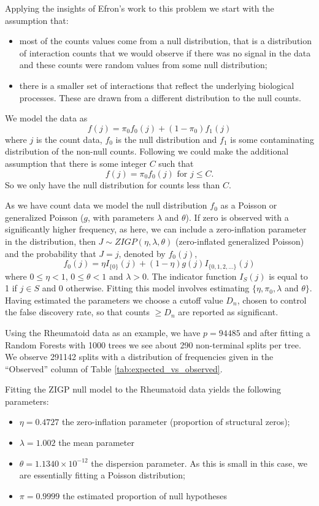 \documentclass[preprint,12pt,3p]{elsarticle}
\begin{document}
Applying the insights of Efron's work to this problem we start with the assumption that:
\begin{itemize}
\item most of the counts values come from a null distribution, that is a distribution of interaction
  counts that we would observe if there was no signal in the data and these counts were random values from some null distribution;
\item there is a smaller set of interactions that reflect the underlying biological processes. These are drawn from a
  different distribution to the null counts.
\end{itemize}

We model the data as 
\[
f (j ) = \pi_0 f_0 (j ) + (1 - \pi_0 )f_1 (j )
\]
where $j$ is the count data, $f_0$ is the null distribution and $f_1$ is some contaminating distribution of the
non-null counts. Following \cite{Gauran.et.al.2018} we could make the additional assumption that there is some integer $C$ such that
\begin{equation}
  f(j ) = \pi_0 f_0 (j ) \textrm{ for } j \leq C.
\label{eqn:C}  
\end{equation}
So we only have the null distribution for counts less than $C.$ 

As we have count data we model the null distribution $f_0$ as a Poisson or  generalized Poisson ($g$, with parameters
$\lambda$ and $\theta$).
If zero is observed with a significantly higher frequency, as here, we can include a zero-inflation parameter in the
distribution, then $J \sim ZIGP(\eta, \lambda, \theta)$ (zero-inflated generalized Poisson) and the probability that $J = j$, denoted by $f_0 (j)$, 
\[
  f_0(j) = \eta I_{\{0\}} (j) + (1 - \eta) g(j) I_{\{0,1,2,\ldots \}} (j)
\]
where $0 \leq \eta < 1$, $0 \leq \theta < 1$ and $\lambda > 0$. The indicator function
$I_S (j)$ is equal to 1 if $j \in  S$ and 0 otherwise. Fitting this model involves estimating $\{ \eta, \pi_0,
\lambda$ and $\theta \}$. Having estimated the parameters we choose a cutoff value $D_n$, chosen to control the false
discovery rate, so that counts $\geq  D_n$ are reported as significant.

Using the Rheumatoid data as an example, we have $p= 94485$ and after fitting a Random Forests with
1000 trees we see about 290 non-terminal splits per tree. We observe 291142 splits with a distribution of frequencies
given in the ``Observed'' column of Table \ref{tab:expected_vs_observed}.


Fitting the ZIGP null model to the Rheumatoid data yields the following parameters:
\begin{itemize}
\item $\eta= 0.4727$    the zero-inflation parameter (proportion of structural zeros);
\item $\lambda= 1.002$   the mean parameter
\item $\theta= 1.1340\times 10^{-12}$   the dispersion parameter. As this is small in this case, we are essentially
  fitting a Poisson distribution;
\item $\pi= 0.9999$  the estimated proportion of null hypotheses
\end{itemize}
\end{document}
